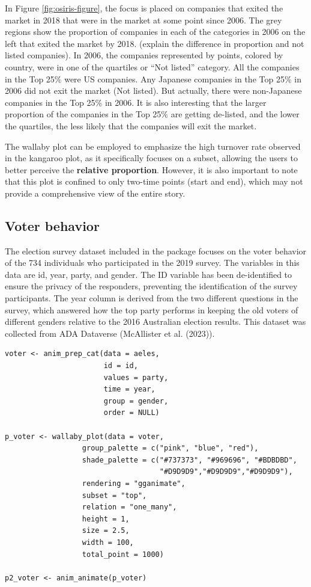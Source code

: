 In Figure \ref{fig:osiris-figure}, the focus is placed on companies that exited the market in 2018 that were in the market at some point since 2006. The grey regions show the proportion of companies in each of the categories in 2006 on the left that exited the market by 2018. (explain the difference in proportion and not listed companies). In 2006, the companies represented by points, colored by country, were in one of the quartiles or ``Not listed'' category. All the companies in the Top 25\% were US companies. Any Japanese companies in the Top 25\% in 2006 did not exit the market (Not listed). But actually, there were non-Japanese companies in the Top 25\% in 2006. It is also interesting that the larger proportion of the companies in the Top 25\% are getting de-listed, and the lower the quartiles, the less likely that the companies will exit the market.

The wallaby plot can be employed to emphasize the high turnover rate observed in the kangaroo plot, as it specifically focuses on a subset, allowing the users to better perceive the \textbf{relative proportion}. However, it is also important to note that this plot is confined to only two-time points (start and end), which may not provide a comprehensive view of the entire story.

\hypertarget{voter-behavior}{%
\subsection{Voter behavior}\label{voter-behavior}}

The election survey dataset included in the  package focuses on the voter behavior of the 734 individuals who participated in the 2019 survey. The variables in this data are id, year, party, and gender. The ID variable has been de-identified to ensure the privacy of the responders, preventing the identification of the survey participants. The year column is derived from the two different questions in the survey, which answered how the top party performs in keeping the old voters of different genders relative to the 2016 Australian election results. This dataset was collected from ADA Dataverse (McAllister et al. (2023)).

\begin{verbatim}
voter <- anim_prep_cat(data = aeles,
                       id = id,
                       values = party,
                       time = year,
                       group = gender,
                       order = NULL)

p_voter <- wallaby_plot(data = voter,
                  group_palette = c("pink", "blue", "red"),
                  shade_palette = c("#737373", "#969696", "#BDBDBD",
                                    "#D9D9D9","#D9D9D9","#D9D9D9"),
                  rendering = "gganimate",
                  subset = "top",
                  relation = "one_many",
                  height = 1,
                  size = 2.5,
                  width = 100,
                  total_point = 1000)

p2_voter <- anim_animate(p_voter)
\end{verbatim}

